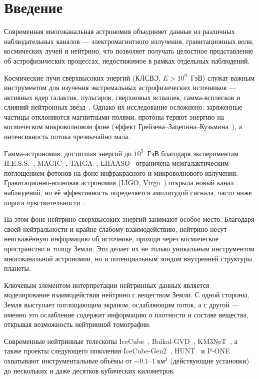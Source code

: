 \section{Введение}

Современная многоканальная астрономия объединяет данные из различных наблюдательных каналов — электромагнитного излучения, гравитационных волн, космических лучей и нейтрино, что позволяет получать целостное представление об астрофизических процессах, недостижимое в рамках отдельных наблюдений.

Космические лучи сверхвысоких энергий (КЛСВЭ, $E > 10^9$~ГэВ) служат важным инструментом для изучения экстремальных астрофизических источников — активных ядер галактик, пульсаров, сверхновых вспышек, гамма-всплесков и слияний нейтронных звёзд~\cite{auger2020anisotropy, auger2020spectrum, kotera2011astrophysics, kimura2017ultrahigh}.  
Однако их исследование осложнено: заряженные частицы отклоняются магнитными полями, протоны теряют энергию на космическом микроволновом фоне (эффект Грейзена–Зацепина–Кузьмина~\cite{greisen1966}), а интенсивность потока чрезвычайно мала.  

Гамма-астрономия, достигшая энергий до $10^5$~ГэВ благодаря экспериментам H.E.S.S.~\cite{hess2021}, MAGIC~\cite{hessandmagic2021}, TAIGA~\cite{Elshoukrofy:2023My}, LHAASO~\cite{LHAASO2021_UHEgamma,Zhao2023_LHAASO_PeVdiffuse} ограничена межгалактическим поглощением фотонов на фоне инфракрасного и микроволнового излучения.  
Гравитационно-волновая астрономия (LIGO, Virgo~\cite{virgoandligo2016, Abbott:2017, Fan:2024}) открыла новый канал наблюдений, но её эффективность определяется амплитудой сигнала, часто ниже порога чувствительности~\cite{Isaacson1968, LIGOScientific:2018Sens}.  

На этом фоне нейтрино сверхвысоких энергий занимают особое место. Благодаря своей нейтральности и крайне слабому взаимодействию, нейтрино несут неискажённую информацию об источнике, проходя через космическое пространство и толщу Земли. Это делает их не только уникальным инструментом многоканальной астрономии, но и потенциальным зондом внутренней структуры планеты.

Ключевым элементом интерпретации нейтринных данных является моделирование взаимодействия нейтрино с веществом Земли. С одной стороны, Земля выступает поглощающим экраном, ослабляющим поток, а с другой — именно это ослабление содержит информацию о плотности и составе вещества, открывая возможность нейтринной томографии.

Современные нейтринные телескопы IceCube~\cite{IceCube_JINST2017}, Baikal-GVD~\cite{BaikalGVD_2021_status}, KM3NeT~\cite{KM3NeT_LOI2016}, а также проекты следующего поколения IceCube-Gen2~\cite{IceCubeGen2_WhitePaper2020}, HUNT~\cite{HUNT_ICRC2023} и P-ONE~\cite{PONE_WhitePaper2020} охватывают инструментальные объёмы от $\sim0.1$–$1~\text{км}^3$ (действующие установки) до нескольких и даже десятков кубических километров.

